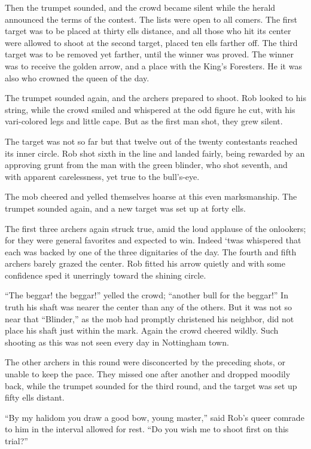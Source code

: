 Then the trumpet sounded, and the crowd became silent while the herald
announced the terms of the contest. The lists were open to all comers.
The first target was to be placed at thirty ells distance, and all those
who hit its center were allowed to shoot at the second target, placed
ten ells farther off. The third target was to be removed yet farther,
until the winner was proved. The winner was to receive the golden arrow,
and a place with the King's Foresters. He it was also who crowned the
queen of the day.

The trumpet sounded again, and the archers prepared to shoot. Rob looked
to his string, while the crowd smiled and whispered at the odd figure he
cut, with his vari-colored legs and little cape. But as the first man
shot, they grew silent.

The target was not so far but that twelve out of the twenty contestants
reached its inner circle. Rob shot sixth in the line and landed fairly,
being rewarded by an approving grunt from the man with the green
blinder, who shot seventh, and with apparent carelessness, yet true to
the bull's-eye.

The mob cheered and yelled themselves hoarse at this even marksmanship.
The trumpet sounded again, and a new target was set up at forty ells.

The first three archers again struck true, amid the loud applause of the
onlookers; for they were general favorites and expected to win. Indeed
`twas whispered that each was backed by one of the three dignitaries of
the day. The fourth and fifth archers barely grazed the center. Rob
fitted his arrow quietly and with some confidence sped it unerringly
toward the shining circle.

``The beggar! the beggar!'' yelled the crowd; ``another bull for the
beggar!'' In truth his shaft was nearer the center than any of the
others. But it was not so near that ``Blinder,'' as the mob had promptly
christened his neighbor, did not place his shaft just within the mark.
Again the crowd cheered wildly. Such shooting as this was not seen every
day in Nottingham town.

The other archers in this round were disconcerted by the preceding
shots, or unable to keep the pace. They missed one after another and
dropped moodily back, while the trumpet sounded for the third round, and
the target was set up fifty ells distant.

``By my halidom you draw a good bow, young master,'' said Rob's queer
comrade to him in the interval allowed for rest. ``Do you wish me to
shoot first on this trial?''

